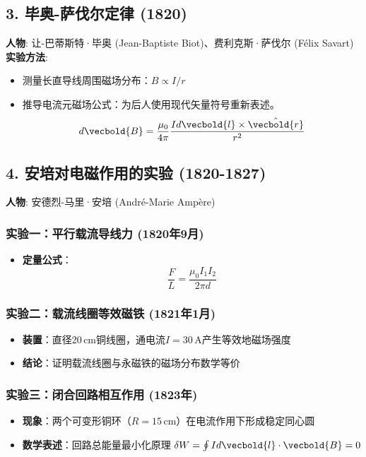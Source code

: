 \subsection*{3. 毕奥-萨伐尔定律 (1820)}
\textbf{人物}: 让-巴蒂斯特·毕奥 (Jean-Baptiste Biot)、费利克斯·萨伐尔 (Félix Savart)\\
\textbf{实验方法}:
\begin{itemize}
    \item 测量长直导线周围磁场分布：$B \propto I/r$
    \item 推导电流元磁场公式：为后人使用现代矢量符号重新表述。
    \begin{equation*}
        d\vecbold{B} = \frac{\mu_0}{4\pi}\frac{I d\vecbold{l} \times \hat{\vecbold{r}}}{r^2}
    \end{equation*}
\end{itemize}

\subsection*{4. 安培对电磁作用的实验 (1820-1827)}
\textbf{人物}: 安德烈-马里·安培 (André-Marie Ampère)

\subsubsection*{实验一：平行载流导线力 (1820年9月)}
\begin{itemize}
    \item \textbf{定量公式}：
    \begin{equation*}
        \frac{F}{L} = \frac{\mu_0 I_1 I_2}{2\pi d} 
    \end{equation*}
\end{itemize}

\subsubsection*{实验二：载流线圈等效磁铁 (1821年1月)}
\begin{itemize}
    \item \textbf{装置}：直径20\,cm铜线圈，通电流$I=30$\,A产生等效地磁场强度
    \item \textbf{结论}：证明载流线圈与永磁铁的磁场分布数学等价
\end{itemize}

\subsubsection*{实验三：闭合回路相互作用 (1823年)}
\begin{itemize}
    \item \textbf{现象}：两个可变形铜环（$R=15$\,cm）在电流作用下形成稳定同心圆
    \item \textbf{数学表述}：回路总能量最小化原理 $\delta W = \oint I d\vecbold{l} \cdot \vecbold{B} = 0$
\end{itemize}

